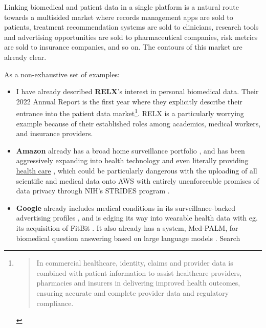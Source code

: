 Linking biomedical and patient data in a single platform is a natural
route towards a multisided market where records management apps are sold
to patients, treatment recommendation systems are sold to clinicians,
research tools and advertising opportunities are sold to pharmaceutical
companies, risk metrics are sold to insurance companies, and so on. The
contours of this market are already clear.

As a non-exhaustive set of examples:

\begin{itemize}

\item
  I have already described \textbf{RELX}'s interest in personal
  biomedical data. Their 2022 Annual Report \cite{relxAnnualReport20222023}  is the first year where they explicitly
  describe their entrance into the patient data market\footnote{\begin{quote}
    In commercial healthcare, identity, claims and provider data is
    combined with patient information to assist healthcare providers,
    pharmacies and insurers in delivering improved health outcomes,
    ensuring accurate and complete provider data and regulatory
    compliance. \cite{relxAnnualReport20222023} 
    \end{quote}}. RELX is a particularly worrying example because of
  their established roles among academics, medical workers, and
  insurance providers.
\item
  \textbf{Amazon} already has a broad home surveillance portfolio \cite{bridgesAmazonRingLargest2021} , and has been aggressively
  expanding into health technology \cite{AWSAnnouncesAWS2021} 
  and even literally providing \href{https://amazon.care/}{health care}
  \cite{fingasAmazonOfficiallyBecomes2023, lermanAmazonBuiltIts2021} , which could be particularly dangerous with the uploading of all
  scientific and medical data onto AWS with entirely unenforceable
  promises of data privacy through NIH's STRIDES program \cite{quinnYouCanTrust2021} .
\item
  \textbf{Google} already includes medical conditions in its
  surveillance-backed advertising profiles \cite{krashinskyGoogleBrokeCanada2014, bharatGeneratingUserInformation2005} , and is edging its way into wearable health data with eg. its
  acquisition of FitBit \cite{bourreauGoogleFitbitWill2020} . It
  also already has a system, Med-PALM, for biomedical question answering
  based on large language models \cite{piferGooglePlansBoost2023, matiasOurLatestHealth2023, singhalLargeLanguageModels2022} . Search

\end{itemize}
